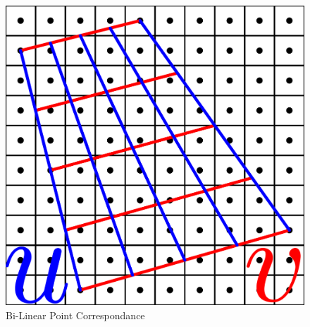 \documentclass{report}
\begin{document}
\begin{figure}[htbp]
	\centering
%	
	\includegraphics[scale=0.25]{BiLinear_Point_Correspondance_v1}
	\caption{Bi-Linear Point Correspondance}
\end{figure}


	
\end{document}
